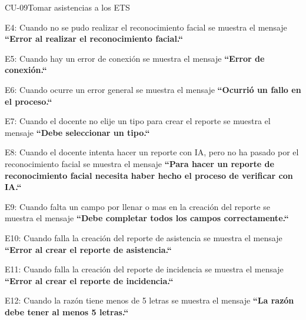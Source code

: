 \begin{UseCase}{CU-09}{Tomar asistencias a los ETS}
{			E4: Cuando no se pudo realizar el reconocimiento facial se muestra el mensaje\textbf{ ``Error al realizar el reconocimiento facial.``}
			
			E5: Cuando hay un error de conexión se muestra el mensaje \textbf{ ``Error de conexión.``}
			
			E6: Cuando ocurre un error general se muestra el mensaje \textbf{ ``Ocurrió un fallo en el proceso.``}
			
			E7: Cuando el docente no elije un tipo para crear el reporte se muestra el mensaje \textbf{ ``Debe seleccionar un tipo.``}
			
			E8: Cuando el docente intenta hacer un reporte con IA, pero no ha pasado por el reconocimiento facial se muestra el mensaje \textbf{ ``Para hacer un reporte de reconocimiento facial necesita haber hecho el proceso de verificar con IA.``}
			
			E9: Cuando falta un campo por llenar o mas en la creación del reporte se muestra el mensaje \textbf{ ``Debe completar todos los campos correctamente.``}
			
			E10: Cuando falla la creación del reporte de asistencia se muestra el mensaje \textbf{ ``Error al crear el reporte de asistencia.``}
			
			E11: Cuando falla la creación del reporte de incidencia se muestra el mensaje \textbf{ ``Error al crear el reporte de incidencia.``}
			
			E12: Cuando la razón tiene menos de 5 letras se muestra el mensaje\textbf{ ``La razón debe tener al menos 5 letras.``}
		
	}
\end{UseCase}
